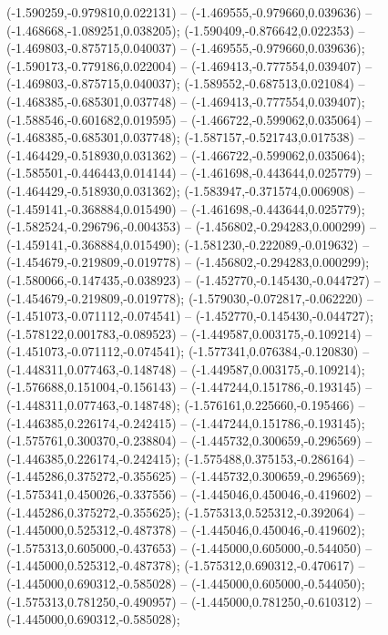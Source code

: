  (-1.590259,-0.979810,0.022131) -- (-1.469555,-0.979660,0.039636) -- (-1.468668,-1.089251,0.038205);
 (-1.590409,-0.876642,0.022353) -- (-1.469803,-0.875715,0.040037) -- (-1.469555,-0.979660,0.039636);
 (-1.590173,-0.779186,0.022004) -- (-1.469413,-0.777554,0.039407) -- (-1.469803,-0.875715,0.040037);
 (-1.589552,-0.687513,0.021084) -- (-1.468385,-0.685301,0.037748) -- (-1.469413,-0.777554,0.039407);
 (-1.588546,-0.601682,0.019595) -- (-1.466722,-0.599062,0.035064) -- (-1.468385,-0.685301,0.037748);
 (-1.587157,-0.521743,0.017538) -- (-1.464429,-0.518930,0.031362) -- (-1.466722,-0.599062,0.035064);
 (-1.585501,-0.446443,0.014144) -- (-1.461698,-0.443644,0.025779) -- (-1.464429,-0.518930,0.031362);
 (-1.583947,-0.371574,0.006908) -- (-1.459141,-0.368884,0.015490) -- (-1.461698,-0.443644,0.025779);
 (-1.582524,-0.296796,-0.004353) -- (-1.456802,-0.294283,0.000299) -- (-1.459141,-0.368884,0.015490);
 (-1.581230,-0.222089,-0.019632) -- (-1.454679,-0.219809,-0.019778) -- (-1.456802,-0.294283,0.000299);
 (-1.580066,-0.147435,-0.038923) -- (-1.452770,-0.145430,-0.044727) -- (-1.454679,-0.219809,-0.019778);
 (-1.579030,-0.072817,-0.062220) -- (-1.451073,-0.071112,-0.074541) -- (-1.452770,-0.145430,-0.044727);
 (-1.578122,0.001783,-0.089523) -- (-1.449587,0.003175,-0.109214) -- (-1.451073,-0.071112,-0.074541);
 (-1.577341,0.076384,-0.120830) -- (-1.448311,0.077463,-0.148748) -- (-1.449587,0.003175,-0.109214);
 (-1.576688,0.151004,-0.156143) -- (-1.447244,0.151786,-0.193145) -- (-1.448311,0.077463,-0.148748);
 (-1.576161,0.225660,-0.195466) -- (-1.446385,0.226174,-0.242415) -- (-1.447244,0.151786,-0.193145);
 (-1.575761,0.300370,-0.238804) -- (-1.445732,0.300659,-0.296569) -- (-1.446385,0.226174,-0.242415);
 (-1.575488,0.375153,-0.286164) -- (-1.445286,0.375272,-0.355625) -- (-1.445732,0.300659,-0.296569);
 (-1.575341,0.450026,-0.337556) -- (-1.445046,0.450046,-0.419602) -- (-1.445286,0.375272,-0.355625);
 (-1.575313,0.525312,-0.392064) -- (-1.445000,0.525312,-0.487378) -- (-1.445046,0.450046,-0.419602);
 (-1.575313,0.605000,-0.437653) -- (-1.445000,0.605000,-0.544050) -- (-1.445000,0.525312,-0.487378);
 (-1.575312,0.690312,-0.470617) -- (-1.445000,0.690312,-0.585028) -- (-1.445000,0.605000,-0.544050);
 (-1.575313,0.781250,-0.490957) -- (-1.445000,0.781250,-0.610312) -- (-1.445000,0.690312,-0.585028);
